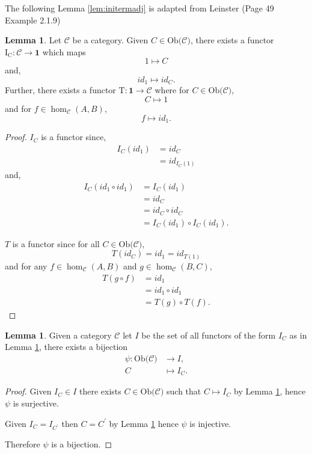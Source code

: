 \documentclass[11pt,a4paper]{article}
\theoremstyle{definition}
\newtheorem{lemma}[thm]{Lemma}
\newcommand\ho[3][]{\hom_{#1}(#2,#3)}
\newcommand\ob[1]{\mathrm{Ob(}#1\mathrm{)}}
\newcommand\cat[1]{\mathscr{#1}}
\newcommand\func[3]{\mathrm{#1}\colon#2\rightarrow#3}
\numberwithin{equation}{section}
\begin{document}
The following Lemma \ref{lem:initermadj} is adapted from Leinster \cite{Leinster} (Page 49 Example 2.1.9)

\begin{lemma}
    \label{lem:funcadj}
    Let $\cat{C}$ be a category. Given $C\in\ob{\cat{C}}$, there exists a functor $\func{I_{C}}{\cat{C}}{\mathbf{1}}$ which maps \[1\mapsto C\] and, \[id_{1}\mapsto id_{C}.\] Further, there exists a functor $\func{T}{\mathbf{1}}{\cat{C}}$ where for $C\in\ob{\cat{C}}$, \[C\mapsto 1\] and for $f\in\ho[\cat{C}]{A}{B}$, \[f\mapsto id_{1}.\]
\end{lemma}
\begin{proof}
    $I_{C}$ is a functor since,
    \begin{align*}
    I_{C}(id_{1}) &= id_{C} \\
    &= id_{I_{C}(1)}
    \end{align*} and,
    \begin{align*}
    I_{C}(id_{1}\circ id_{1}) &= I_{C}(id_{1}) \\ 
    &= id_{C} \\
    &= id_{C}\circ id_{C} \\
    &= I_{C}(id_{1})\circ I_{C}(id_{1}).
    \end{align*}
    
    $T$ is a functor since for all $C\in\ob{\cat{C}}$, \[T(id_{C})=id_{1} = id_{T(1)}\] and for any $f\in\ho[\cat{C}]{A}{B}$ and $g\in\ho[\cat{C}]{B}{C}$,
    \begin{align*}
    T(g\circ f) &= id_{1} \\
    &= id_{1}\circ id_{1} \\
    &= T(g)\circ T(f).
    \end{align*}
\end{proof}

\begin{lemma}
    \label{lem:bijecobfunc}
    Given a category $\cat{C}$ let $I$ be the set of all functors of the form $I_{C}$ as in Lemma \ref{lem:funcadj}, there exists a bijection
    \begin{align*}
        \psi\colon\ob{\cat{C}}&\to I,\\
        C&\mapsto I_{C}.
    \end{align*}
\end{lemma}
\begin{proof}
    Given $I_{C}\in I$ there exists $C\in\ob{\cat{C}}$ such that $C\mapsto I_{C}$ by Lemma \ref{lem:funcadj}, hence $\psi$ is surjective.
    
    Given $I_{C}=I_{C^\prime}$ then $C=C^\prime$ by Lemma \ref{lem:funcadj} hence $\psi$ is injective. 
    
    Therefore $\psi$ is a bijection.
\end{proof}
\end{document}
